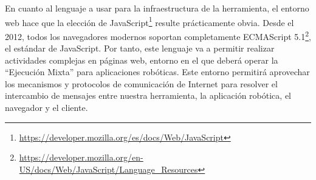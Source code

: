 En cuanto al lenguaje a usar para la infraestructura de la herramienta, el entorno web hace que la elección de JavaScript\footnote{\url{https://developer.mozilla.org/es/docs/Web/JavaScript}} resulte prácticamente obvia. Desde el 2012, todos los navegadores modernos soportan completamente ECMAScript 5.1\footnote{\url{https://developer.mozilla.org/en-US/docs/Web/JavaScript/Language_Resources}}, el estándar de JavaScript. Por tanto, este lenguaje va a permitir realizar actividades complejas en páginas web, entorno en el que deberá operar la ``Ejecución Mixta'' para aplicaciones robóticas. Este entorno permitirá aprovechar los mecanismos y protocolos de comunicación de Internet para resolver el intercambio de mensajes entre nuestra herramienta, la aplicación robótica, el navegador y el cliente.